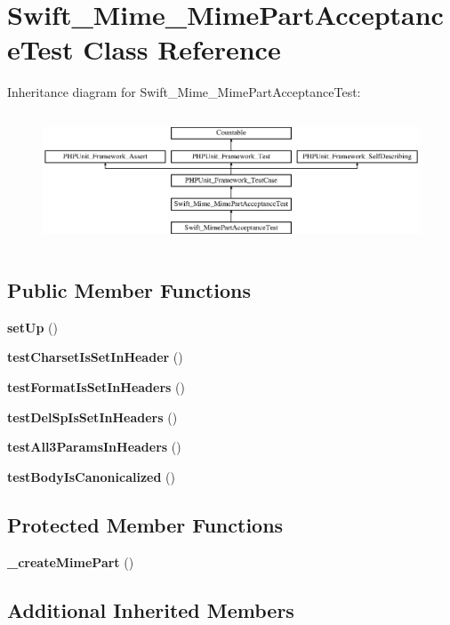 \section{Swift\+\_\+\+Mime\+\_\+\+Mime\+Part\+Acceptance\+Test Class Reference}
\label{class_swift___mime___mime_part_acceptance_test}
Inheritance diagram for Swift\+\_\+\+Mime\+\_\+\+Mime\+Part\+Acceptance\+Test\+:\begin{figure}[H]
\begin{center}
\leavevmode
\includegraphics[height=3.971631cm]{class_swift___mime___mime_part_acceptance_test}
\end{center}
\end{figure}
\subsection*{Public Member Functions}
\begin{DoxyCompactItemize}
\item 
{\bf set\+Up} ()
\item 
{\bf test\+Charset\+Is\+Set\+In\+Header} ()
\item 
{\bf test\+Format\+Is\+Set\+In\+Headers} ()
\item 
{\bf test\+Del\+Sp\+Is\+Set\+In\+Headers} ()
\item 
{\bf test\+All3\+Params\+In\+Headers} ()
\item 
{\bf test\+Body\+Is\+Canonicalized} ()
\end{DoxyCompactItemize}
\subsection*{Protected Member Functions}
\begin{DoxyCompactItemize}
\item 
{\bf \+\_\+create\+Mime\+Part} ()
\end{DoxyCompactItemize}
\subsection*{Additional Inherited Members}


